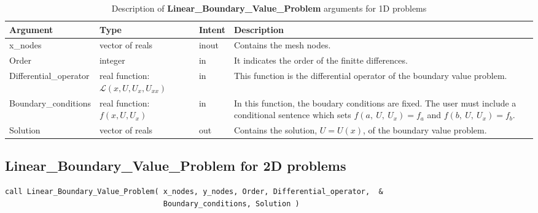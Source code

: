 \begin{table}[H]
	\begin{center}
		\begin{spacing}{1.2}
			\begin{tabular}{| l | p{3cm}| l | p{5cm} |}
				
				\hline
				
				\bf Argument & \bf Type & \bf Intent & \bf Description \\ \hline \hline
				
				x\_nodes & vector of reals & inout &  Contains the mesh nodes.  \\ \hline
				
				Order &  integer  & in & It indicates the order of the finitte differences.  \\ \hline
				
				Differential\_operator & \raggedright real function: $\mathscr{L}\left(x, U,  U_x,  U_{xx} \right)$ & in  & This function is the differential operator of the boundary value problem.   \\ \hline
				
				Boundary\_conditions & \raggedright real function: $f\left(x, U,  U_x \right)$  & in &  In this function, the boudary conditions are fixed. The user must include a conditional sentence which sets $f\left(a,\ U, \ U_x \right) = f_a$ and $f\left(b,\ U, \ U_x \right) = f_b$.  \\ \hline
				
				Solution & vector of reals  & out &  Contains the solution, $U = U(x)$, of the boundary value problem. \\ \hline
				
				
			\end{tabular}
		\end{spacing}
	\end{center}
	\caption{Description of \textbf{Linear\_Boundary\_Value\_Problem} arguments for 1D problems}
\end{table}

\newpage

\subsection*{Linear\_Boundary\_Value\_Problem for 2D problems}

\lstset{language=Fortran}
\begin{lstlisting}[frame=trBL]
call Linear_Boundary_Value_Problem( x_nodes, y_nodes, Order, Differential_operator,  &
                                    Boundary_conditions, Solution ) 
\end{lstlisting}   


